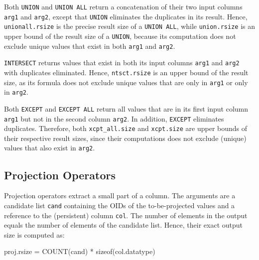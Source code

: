\documentclass[conference]{IEEEtran}
\def\Skip{\par\medskip\nobreak\noindent}
\begin{document}
Both \texttt{\small UNION} and \texttt{\small UNION ALL} return a concatenation of their two input columns \texttt{\small arg1} and \texttt{\small arg2}, except that \texttt{\small UNION} eliminates the duplicates in its result.
Hence, \texttt{\small unionall.rsize} is the precise result size of a \texttt{\small UNION ALL}, while \texttt{\small union.rsize} is an upper bound of the result size of a \texttt{\small UNION}, because its computation does not exclude unique values that exist in both \texttt{\small arg1} and \texttt{\small arg2}.

\texttt{\small INTERSECT} returns values that exist in both its input columns \texttt{\small arg1} and \texttt{\small arg2} with duplicates eliminated.
Hence, \texttt{\small ntsct.rsize} is an upper bound of the result size, as its formula does not exclude unique values that are only in \texttt{\small arg1} or only in \texttt{\small arg2}.

Both \texttt{\small EXCEPT} and \texttt{\small EXCEPT ALL} return all values that are in its first input column \texttt{\small arg1} but not in the second column \texttt{\small arg2}.
In addition, \texttt{\small EXCEPT} eliminates duplicates.
Therefore, both \texttt{\small xcpt\_all.size} and \texttt{\small xcpt.size} are upper bounds of their respective result sizes, since their computations does not exclude (unique) values that also exist in \texttt{\small arg2}.

\subsection{Projection Operators}
Projection operators extract a small part of a column.
The arguments are a candidate list \texttt{\small cand} containing the OIDs of the to-be-projected values and a reference to the (persistent) column \texttt{\small col}.
The number of elements in the output equals the number of elements of the candidate list. %
Hence, their exact output size is computed as:
\begin{verb}
proj.rsize = COUNT(cand) * sizeof(col.datatype)
\end{verb}

\end{document}
